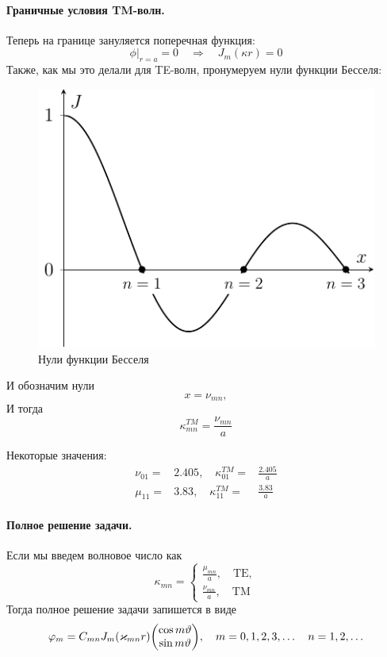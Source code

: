 \paragraph{Граничные условия TM-волн.} Теперь на границе зануляется поперечная функция:
\begin{equation}
	\phi\big|_{r=a}=0 
		\quad \Rightarrow \quad
			J_m(\kappa r)=0
\end{equation}
Также, как мы это делали для TE-волн, пронумеруем нули функции Бесселя:
\begin{figure}[H]
	\centering
	\includegraphics[scale=1.5]{img_lect5/bessel/bessel_kappa}
	\caption{Нули функции Бесселя}
	\label{fig:cylinder:besselN}
\end{figure}
И обозначим нули 
\begin{equation}
	x=\nu_{mn},
\end{equation}
И тогда
\begin{equation}
	\kappa_{mn}^{TM}=\frac{\nu_{mn}}{a}
\end{equation}

Некоторые значения:
\begin{equation}
\begin{aligned}
 		\nu_{01}=&2.405, \quad \kappa_{01}^{TM}=&\frac{2.405}{a}\\[1em]
 		\mu_{11}=&3.83, \quad \kappa_{11}^{TM}=&\frac{3.83}{a}
\end{aligned} 	
\end{equation}

\paragraph{Полное решение задачи.} Если мы введем волновое число как
\begin{equation}
	\kappa_{mn}=\left\{
	\begin{aligned}
		\frac{\mu_{mn}}{a}, \quad \mathrm{TE},\\
		\frac{\nu_{mn}}{a}, \quad \mathrm{TM}
	\end{aligned}\right.
\end{equation}
Тогда полное решение задачи запишется  в виде
\begin{equation}
	\phi_m=C_{mn} J_m(\kappa_{mn} r)\mqty(\cos m\vartheta \\\sin m\vartheta), \quad
	m=0,1,2,3,\ldots \quad n=1,2,\ldots
\end{equation}

